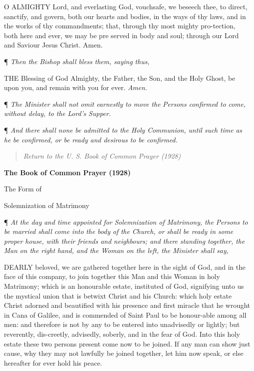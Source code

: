 O ALMIGHTY Lord, and everlasting
God, vouchsafe, we beseech thee, to direct, sanctify, and govern, both
our hearts and bodies, in the ways of thy laws, and in the works of thy
commandments; that, through thy most mighty pro-tection, both here and
ever, we may be pre served in body and soul; through our Lord and Saviour
Jesus Christ. Amen.

¶ \emph{Then the Bishop shall bless
them, saying thus,}

THE Blessing of God Almighty,
the Father, the Son, and the Holy Ghost, be upon you, and remain with
you for ever. \emph{Amen}.

¶ \emph{The Minister
shall not omit earnestly to move the Persons confirmed to come, without
delay, to the Lord’s Supper.}

¶ \emph{And there shall
none be admitted to the Holy Communion, until such time as he be confirmed,
or be ready and desirous to be confirmed.}

\begin{quote}

\emph{Return to the U.
S. Book of Common Prayer (1928)}

\end{quote}


\textbf{The Book of Common Prayer (1928)}

The Form of

Solemnization of Matrimony

¶
\emph{At the day and time appointed for Solemnization of Matrimony, the
Persons to be married shall come into the body of the Church, or shall
be ready in some proper house, with their friends and neighbours; and
there standing together, the Man on the right hand, and the Woman on the
left, the Minister shall say,}

DEARLY
beloved, we are gathered together here in the sight of God, and in the
face of this company, to join together this Man and this Woman in holy
Matrimony; which is an honourable estate, instituted of God, signifying
unto us the mystical union that is betwixt Christ and his Church: which
holy estate Christ adorned and beautified with his presence and first
miracle that he wrought in Cana of Galilee, and is commended of Saint
Paul to be honour-able among all men: and therefore is not by any to be
entered into unadvisedly or lightly; but reverently, dis-creetly, advisedly,
soberly, and in the fear of God. Into this holy estate these two persons
present come now to be joined. If any man can show just cause, why they
may not lawfully be joined together, let him now speak, or else hereafter
for ever hold his peace.

